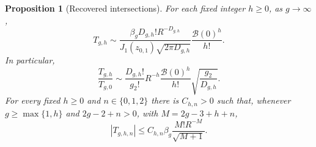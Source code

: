 \documentclass[a4paper,10pt]{article}
\numberwithin{equation}{section}
\theoremstyle{paperplain}
\newtheorem{prp}[thm]{Proposition}
\theoremstyle{paperremark}
\theoremstyle{paperplain}
\begin{document}
\begin{prp}[Recovered intersections]\label{prp:s08:intersections}
For each fixed integer $h\geq0$, as $g\to\infty$,
\begin{equation}\label{eq:s08:intersection-asymptotic}
 T_{g,h}\sim
 \frac{\beta_g D_{g,h}!R^{-D_{g,h}}}
      {J_1(z_{0,1})\sqrt{2\pi D_{g,h}}}
                       \frac{\mathcal B(0)^h}{h!}.
\end{equation}
In particular,
\begin{equation}\label{eq:s08:intersection-ratio}
 \frac{T_{g,h}}{T_{g,0}}
 \sim\frac{D_{g,h}!}{g_2!}R^{-h}
             \frac{\mathcal B(0)^h}{h!}
             \sqrt{\frac{g_2}{D_{g,h}}}.
\end{equation}
For every fixed $h\geq0$ and $n\in\{0,1,2\}$ there is $C_{h,n}>0$
such that, whenever $g\geq\max\{1,h\}$ and $2g-2+n>0$,
with $M=2g-3+h+n$,
\begin{equation}\label{eq:s08:marked-bound}
 |T_{g,h,n}|\leq C_{h,n}\beta_g
                          \frac{M!R^{-M}}{\sqrt{M+1}}.
\end{equation}
\end{prp}
\end{document}
